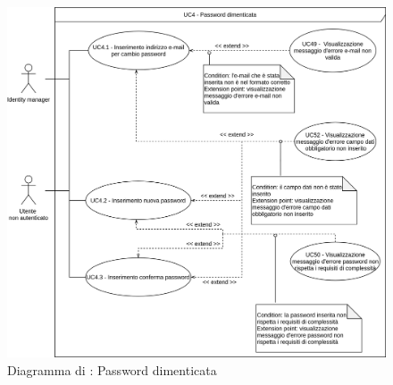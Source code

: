\label{password-dimenticata}

\begin{figure}[H]
    \centering
    \includegraphics[width=\textwidth]{Immagini/DiagrammiUC/AccessoAllaPiattaforma/PasswordDimenticata.png}
    \caption{Diagramma di \actualUC: Password dimenticata} 
    \label{fig:password-dimenticata}
\end{figure}

